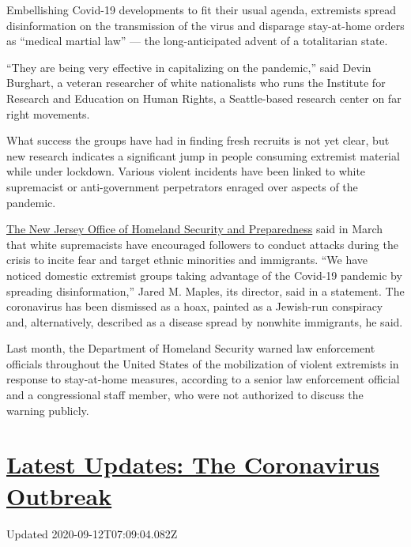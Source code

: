 Embellishing Covid-19 developments to fit their usual agenda, extremists
spread disinformation on the transmission of the virus and disparage
stay-at-home orders as ``medical martial law'' --- the long-anticipated
advent of a totalitarian state.

``They are being very effective in capitalizing on the pandemic,'' said
Devin Burghart, a veteran researcher of white nationalists who runs the
Institute for Research and Education on Human Rights, a Seattle-based
research center on far right movements.

What success the groups have had in finding fresh recruits is not yet
clear, but new research indicates a significant jump in people consuming
extremist material while under lockdown. Various violent incidents have
been linked to white supremacist or anti-government perpetrators enraged
over aspects of the pandemic.

\href{https://www.njhomelandsecurity.gov/covid19}{The New Jersey Office
of Homeland Security and Preparedness} said in March that white
supremacists have encouraged followers to conduct attacks during the
crisis to incite fear and target ethnic minorities and immigrants. ``We
have noticed domestic extremist groups taking advantage of the Covid-19
pandemic by spreading disinformation,'' Jared M. Maples, its director,
said in a statement. The coronavirus has been dismissed as a hoax,
painted as a Jewish-run conspiracy and, alternatively, described as a
disease spread by nonwhite immigrants, he said.

Last month, the Department of Homeland Security warned law enforcement
officials throughout the United States of the mobilization of violent
extremists in response to stay-at-home measures, according to a senior
law enforcement official and a congressional staff member, who were not
authorized to discuss the warning publicly.

\hypertarget{latest-updates-the-coronavirus-outbreak}{%
\section{\texorpdfstring{\href{https://www.nytimes3xbfgragh.onion/2020/09/11/world/covid-19-coronavirus.html?action=click\&pgtype=Article\&state=default\&region=MAIN_CONTENT_1\&context=storylines_live_updates}{Latest
Updates: The Coronavirus
Outbreak}}{Latest Updates: The Coronavirus Outbreak}}\label{latest-updates-the-coronavirus-outbreak}}

Updated 2020-09-12T07:09:04.082Z

